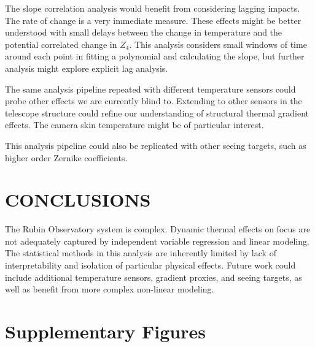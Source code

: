 \documentclass[SE,authoryear,toc]{lsstdoc}
\begin{document}
The slope correlation analysis would benefit from considering lagging impacts. The rate of change is a very immediate measure. These effects might be better understood with small delays between the change in temperature and the potential correlated change in $Z_4$. This analysis considers small windows of time around each point in fitting a polynomial and calculating the slope, but further analysis might explore explicit lag analysis. 

The same analysis pipeline repeated with different temperature sensors could probe other effects we are currently blind to. Extending to other sensors in the telescope structure could refine our understanding of structural thermal gradient effects. The camera skin temperature might be of particular interest.

This analysis pipeline could also be replicated with other seeing targets, such as higher order Zernike coefficients.


\section{CONCLUSIONS}
\label{sec: Conclusions}

The Rubin Observatory system is complex. Dynamic thermal effects on focus are not adequately captured by independent variable regression and linear modeling. The statistical methods in this analysis are inherently limited by lack of interpretability and isolation of particular physical effects. Future work could include additional temperature sensors, gradient proxies, and seeing targets, as well as benefit from more complex non-linear modeling.


\appendix

\section{Supplementary Figures}

\setcounter{figure}{0}
\setcounter{table}{0}
\renewcommand{\thefigure}{A\arabic{figure}}
\renewcommand{\thetable}{A\arabic{table}}
\renewcommand{\theHfigure}{A\arabic{figure}}
\renewcommand{\theHtable}{A\arabic{table}}
\end{document}
